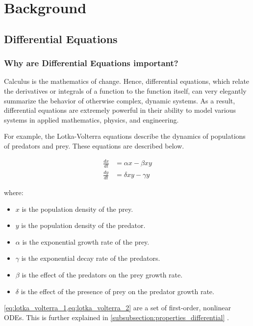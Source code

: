 \section{Background}
\label{section:background}
\subsection{Differential Equations}
\subsubsection{Why are Differential Equations important?}
Calculus is the mathematics of change. Hence, differential equations, which relate the derivatives or integrals of a function to the function itself, can very elegantly summarize the behavior of otherwise complex, dynamic systems. As a result, differential equations are extremely powerful in their ability to model various systems in applied mathematics, physics, and engineering.

For example, the Lotka-Volterra equations describe the dynamics of populations of predators and prey. These equations are described below.

\begin{align}
    \frac{dx}{dt} &= \alpha x - \beta x y \label{eq:lotka_volterra_1} \\
    \frac{dy}{dt} &= \delta x y - \gamma y \label{eq:lotka_volterra_2}
\end{align}

\noindent
where:
\begin{itemize}
    \item $x$ is the population density of the prey.
    \item $y$ is the population density of the predator.
    \item $\alpha$ is the exponential growth rate of the prey.
    \item $\gamma$ is the exponential decay rate of the predators.
    \item $\beta$ is the effect of the predators on the prey growth rate.
    \item $\delta$ is the effect of the presence of prey on the predator growth rate.
\end{itemize}

\cref{eq:lotka_volterra_1,eq:lotka_volterra_2} are a set of first-order, nonlinear ODEs. This is further explained in \cref{subsubsection:properties_differential} .

